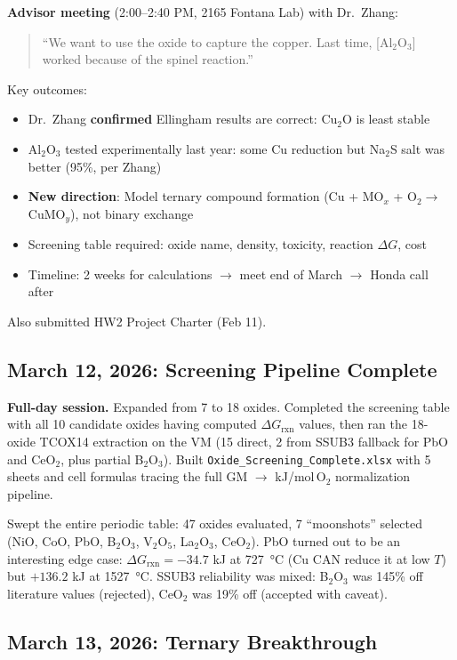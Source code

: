 \documentclass[11pt]{article}
\begin{document}
\textbf{Advisor meeting} (2:00--2:40 PM, 2165 Fontana Lab) with Dr.\ Zhang:

\begin{quote}
``We want to use the oxide to capture the copper. Last time, [Al$_2$O$_3$] worked because of the spinel reaction.''
\end{quote}

Key outcomes:
\begin{itemize}[leftmargin=*]
    \item Dr.\ Zhang \textbf{confirmed} Ellingham results are correct: Cu$_2$O is least stable
    \item Al$_2$O$_3$ tested experimentally last year: some Cu reduction but Na$_2$S salt was better (95\%, per Zhang)
    \item \textbf{New direction}: Model ternary compound formation (Cu + MO$_x$ + O$_2 \to$ CuMO$_y$), not binary exchange
    \item Screening table required: oxide name, density, toxicity, reaction $\Delta G$, cost
    \item Timeline: 2 weeks for calculations $\to$ meet end of March $\to$ Honda call after
\end{itemize}

Also submitted HW2 Project Charter (Feb 11).

\subsection{March 12, 2026: Screening Pipeline Complete}

\textbf{Full-day session.} Expanded from 7 to 18 oxides. Completed the screening table with all 10 candidate oxides having computed $\Delta G_{\text{rxn}}$ values, then ran the 18-oxide TCOX14 extraction on the VM (15 direct, 2 from SSUB3 fallback for PbO and CeO$_2$, plus partial B$_2$O$_3$). Built \texttt{Oxide\_Screening\_Complete.xlsx} with 5 sheets and cell formulas tracing the full GM $\to$ kJ/mol\,O$_2$ normalization pipeline.

Swept the entire periodic table: 47 oxides evaluated, 7 ``moonshots'' selected (NiO, CoO, PbO, B$_2$O$_3$, V$_2$O$_5$, La$_2$O$_3$, CeO$_2$). PbO turned out to be an interesting edge case: $\Delta G_{\text{rxn}} = -34.7$ kJ at \SI{727}{\celsius} (Cu CAN reduce it at low $T$) but $+136.2$ kJ at \SI{1527}{\celsius}. SSUB3 reliability was mixed: B$_2$O$_3$ was 145\% off literature values (rejected), CeO$_2$ was 19\% off (accepted with caveat).

\subsection{March 13, 2026: Ternary Breakthrough}
\end{document}

